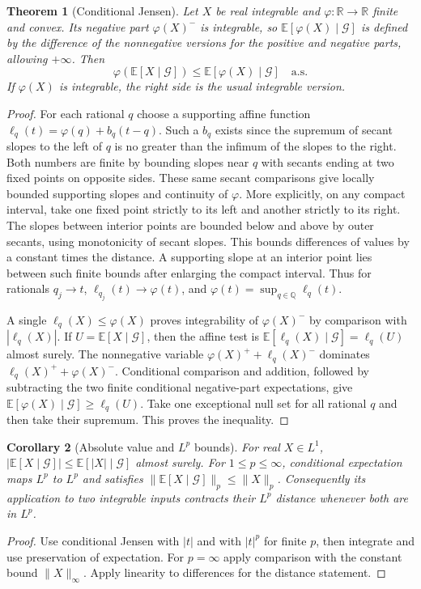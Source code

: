 \documentclass[11pt,oneside,openany]{book}
\theoremstyle{plain}
\newtheorem{theorem}{Theorem}[chapter]
\newtheorem{corollary}[theorem]{Corollary}
\theoremstyle{definition}
\theoremstyle{remark}
\begin{document}
\begin{theorem}[Conditional Jensen]
\label{thm:prob-cond-jensen}
Let \(X\) be real integrable and
\(\varphi\colon\mathbb R\to\mathbb R\) finite and convex. Its
negative part \(\varphi(X)^-\) is integrable, so
\(\mathbb E[\varphi(X)\mid\mathcal G]\) is defined by the
difference of the nonnegative versions for the positive and
negative parts, allowing \(+\infty\). Then
\[
 \varphi(\mathbb E[X\mid\mathcal G])
 \le \mathbb E[\varphi(X)\mid\mathcal G]\quad\text{a.s.}
\]
If \(\varphi(X)\) is integrable, the right side is the usual
integrable version.
\end{theorem}
\begin{proof}
For each rational \(q\) choose a supporting affine function
\(\ell_q(t)=\varphi(q)+b_q(t-q)\). Such a \(b_q\) exists since
the supremum of secant slopes to the left of \(q\) is no greater
than the infimum of the slopes to the right. Both numbers are
finite by bounding slopes near \(q\) with secants ending at two
fixed points on opposite sides. These same secant comparisons
give locally bounded supporting slopes and continuity of
\(\varphi\). More explicitly, on any compact interval,
take one fixed point strictly to its left and another strictly to
its right. The slopes between interior points are bounded below
and above by outer secants, using monotonicity of secant slopes.
This bounds differences of values by a constant times the
distance. A supporting slope at an interior point lies between
such finite bounds after enlarging the compact interval.
Thus for rationals \(q_j\to t\), \(\ell_{q_j}(t)\to\varphi(t)\),
and \(\varphi(t)=\sup_{q\in\mathbb Q}\ell_q(t)\).

A single \(\ell_q(X)\le\varphi(X)\) proves integrability of
\(\varphi(X)^-\) by comparison with \(|\ell_q(X)|\).
If \(U=\mathbb E[X\mid\mathcal G]\), then the affine test is
\(\mathbb E[\ell_q(X)\mid\mathcal G]=\ell_q(U)\) almost surely.
The nonnegative variable
\(\varphi(X)^++\ell_q(X)^-\) dominates
\(\ell_q(X)^++\varphi(X)^-\).
Conditional comparison and addition, followed by subtracting
the two finite conditional negative-part expectations, give
\(\mathbb E[\varphi(X)\mid\mathcal G]\ge\ell_q(U)\).
Take one exceptional null set for all rational \(q\) and then
take their supremum. This proves the inequality.
\end{proof}

\begin{corollary}[Absolute value and \(L^p\) bounds]
\label{thm:prob-condexp-contraction}
For real \(X\in L^1\),
\(|\mathbb E[X\mid\mathcal G]|\le\mathbb E[|X|\mid\mathcal G]\)
almost surely. For \(1\le p\le\infty\), conditional expectation
maps \(L^p\) to \(L^p\) and satisfies
\(\|\mathbb E[X\mid\mathcal G]\|_p\le\|X\|_p\).
Consequently its application to two integrable inputs
contracts their \(L^p\) distance whenever both are in \(L^p\).
\end{corollary}
\begin{proof}
Use conditional Jensen with \(|t|\) and with \(|t|^p\)
for finite \(p\), then integrate and use preservation of
expectation. For \(p=\infty\) apply comparison with the constant
bound \(\|X\|_\infty\). Apply linearity to differences for the
distance statement.
\end{proof}
\end{document}
